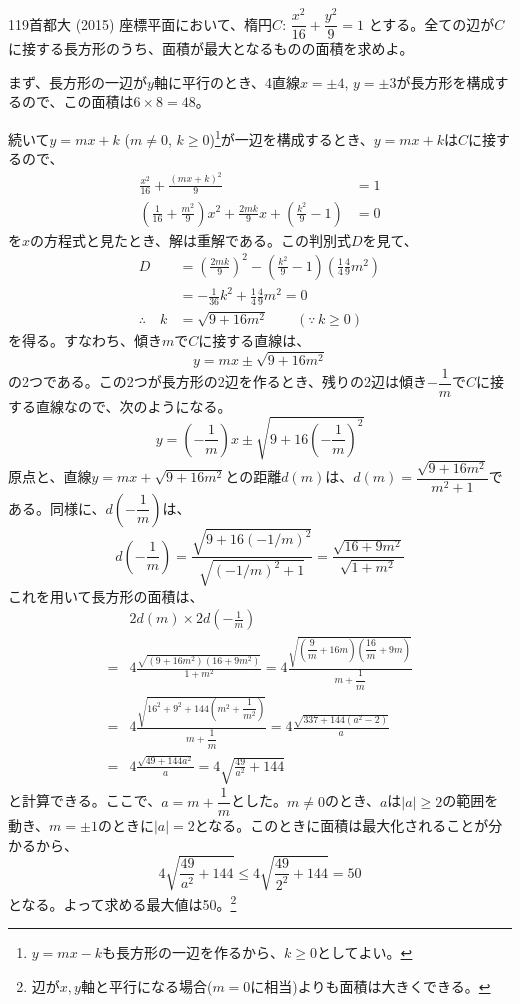 \begin{thm}{119}{}{首都大 (2015)}
 座標平面において、楕円$C$: $\dfrac{x^2}{16}+\dfrac{y^2}{9}=1$ とする。全ての辺が$C$に接する長方形のうち、面積が最大となるものの面積を求めよ。
\end{thm}

まず、長方形の一辺が$y$軸に平行のとき、4直線$x=\pm 4$, $y=\pm 3$が長方形を構成するので、この面積は$6\times 8=48$。

続いて$y=mx+k$ ($m\neq 0$, $k\ge 0$)\footnote{$y=mx-k$も長方形の一辺を作るから、$k\ge 0$としてよい。}が一辺を構成するとき、$y=mx+k$は$C$に接するので、
\begin{align*}
 \frac{x^2}{16}+\frac{(mx+k)^2}{9}&=1 \\
 \left(\frac{1}{16}+\frac{m^2}{9}\right)x^2+\frac{2mk}{9}x+\left(\frac{k^2}{9}-1\right)&=0
\end{align*}
を$x$の方程式と見たとき、解は重解である。この判別式$D$を見て、
\begin{align*}
 D&=\left(\frac{2mk}{9}\right)^2-\left(\frac{k^2}{9}-1\right)\left(\frac{1}{4}\frac{4}{9}m^2\right) \\
 &=-\frac{1}{36}k^2+\frac{1}{4}\frac{4}{9}m^2=0 \\
 \therefore\quad k&=\sqrt{9+16m^2} \qquad (\because\, k\ge 0)
\end{align*}
を得る。すなわち、傾き$m$で$C$に接する直線は、
\[ y=mx\pm\sqrt{9+16m^2} \]
の2つである。この2つが長方形の2辺を作るとき、残りの2辺は傾き$-\dfrac{1}{m}$で$C$に接する直線なので、次のようになる。
\[ y=\left(-\frac{1}{m}\right)x\pm\sqrt{9+16\left(-\frac{1}{m}\right)^2} \]
原点と、直線$y=mx+\sqrt{9+16m^2}$との距離$d(m)$は、$d(m)=\dfrac{\sqrt{9+16m^2}}{m^2+1}$である。同様に、$d\left(-\dfrac{1}{m}\right)$は、
\[ d\left(-\frac{1}{m}\right)=\frac{\sqrt{9+16(-1/m)^2}}{\sqrt{(-1/m)^2+1}}=\frac{\sqrt{16+9m^2}}{\sqrt{1+m^2}} \]
これを用いて長方形の面積は、
\begin{align*}
 &2d(m)\times2d\left(-\frac{1}{m}\right) \\
 =& 4 \frac{\sqrt{(9+16m^2)(16+9m^2)}}{1+m^2}=4\frac{\sqrt{\left(\dfrac{9}{m}+16m\right)\left(\dfrac{16}{m}+9m\right)}}{m+\dfrac{1}{m}} \\
 =& 4 \frac{\sqrt{16^2+9^2+144\left(m^2+\dfrac{1}{m^2}\right)}}{m+\dfrac{1}{m}}=4 \frac{\sqrt{337+144(a^2-2)}}{a} \\
 =& 4 \frac{\sqrt{49+144a^2}}{a}=4\sqrt{\frac{49}{a^2}+144}
\end{align*}
と計算できる。ここで、$a=m+\dfrac{1}{m}$とした。$m\neq 0$のとき、$a$は$|a|\ge 2$の範囲を動き、$m=\pm 1$のときに$|a|=2$となる。このときに面積は最大化されることが分かるから、
\[ 4\sqrt{\frac{49}{a^2}+144}\le 4\sqrt{\frac{49}{2^2}+144}=50 \]
となる。よって求める最大値は50。\footnote{辺が$x,y$軸と平行になる場合($m=0$に相当)よりも面積は大きくできる。}

